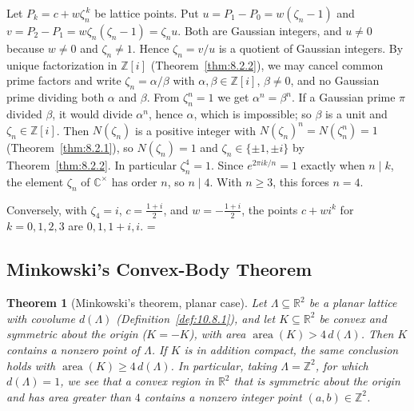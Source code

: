 \documentclass[11pt]{article}
\makeatletter
\theoremstyle{ntstyle}
\newtheorem{theorem}{Theorem}[subsection]
\let\nt@closedisplay\]
\def\nt@guardedclose{\@ifnextchar\par{\nt@closeafterpar}{\@ifnextchar\end{\postdisplaypenalty\@M\nt@closedisplay}{\nt@closedisplay}}}
\def\nt@closeafterpar\par{\@ifnextchar\par{\nt@closeafterpar}{\@ifnextchar\end{\postdisplaypenalty\@M\nt@closedisplay\par}{\nt@closedisplay\par}}}
\renewenvironment{proof}[1][\proofname]{\par
  \pushQED{\qed}\normalfont\topsep\medskipamount\edef\nt@afterproof{\@endparpenalty=\the\@endparpenalty\relax}\@beginparpenalty\@M\@endparpenalty\@M\let\]\nt@guardedclose\trivlist\item[]\textit{#1\@addpunct{.}} \ignorespaces}{\ifvmode\addpenalty\@M\fi\popQED\nt@afterproof\endtrivlist\@endpefalse}
\DeclareMathOperator{\area}{area}
\makeatother
\begin{document}
\begin{proof} Let $P_k=c+w\zeta_n^{\,k}$ be lattice points. Put
	$u=P_1-P_0=w(\zeta_n-1)$ and $v=P_2-P_1=w\zeta_n(\zeta_n-1)=\zeta_n u$. Both
	are Gaussian integers, and $u\neq0$ because $w\neq0$ and $\zeta_n\neq1$.
	Hence $\zeta_n=v/u$ is a quotient of Gaussian integers. By unique
	factorization in $\mathbb{Z}[i]$ (Theorem~\ref{thm:8.2.2}), we may cancel
	common prime factors and write $\zeta_n=\alpha/\beta$ with
	$\alpha,\beta\in\mathbb{Z}[i]$, $\beta\neq0$, and no Gaussian prime dividing
	both $\alpha$ and $\beta$. From $\zeta_n^n=1$ we get $\alpha^n=\beta^n$. If a
	Gaussian prime $\pi$ divided $\beta$, it would divide $\alpha^n$, hence
	$\alpha$, which is impossible; so $\beta$ is a unit and
	$\zeta_n\in\mathbb{Z}[i]$. Then $N(\zeta_n)$ is a positive integer with
	$N(\zeta_n)^n=N(\zeta_n^n)=1$ (Theorem~\ref{thm:8.2.1}), so $N(\zeta_n)=1$
	and $\zeta_n\in\{\pm1,\pm i\}$ by Theorem~\ref{thm:8.2.2}. In particular
	$\zeta_n^4=1$. Since $e^{2\pi ik/n}=1$ exactly when $n\mid k$, the element
	$\zeta_n$ of $\mathbb{C}^{\times}$ has order $n$, so $n\mid4$. With $n\ge3$,
	this forces $n=4$.

	Conversely, with $\zeta_4=i$, $c=\tfrac{1+i}{2}$, and $w=-\tfrac{1+i}{2}$, the
	points $c+wi^k$ for $k=0,1,2,3$ are $0,1,1+i,i$.
\end{proof}
\subsection{Minkowski's Convex-Body Theorem}

\begin{theorem}[Minkowski's theorem, planar case]\label{thm:10.11.1} Let
	$\Lambda\subseteq\mathbb{R}^2$ be a planar lattice with covolume
	$d(\Lambda)$ (Definition~\ref{def:10.8.1}), and let $K\subseteq\mathbb{R}^2$
	be convex and symmetric about the origin ($K=-K$), with area
	$\area(K)>4\,d(\Lambda)$. Then $K$ contains a nonzero
	point of $\Lambda$. If $K$ is in addition compact,
	the same conclusion holds with $\area(K)\ge 4\,d(\Lambda)$. In particular, taking
	$\Lambda=\mathbb{Z}^2$, for which $d(\Lambda)=1$, we see that a convex region in
	$\mathbb{R}^2$ that is symmetric about the origin and has area greater than $4$
	contains a nonzero integer point $(a,b)\in\mathbb{Z}^2$.
\end{theorem}
\end{document}
